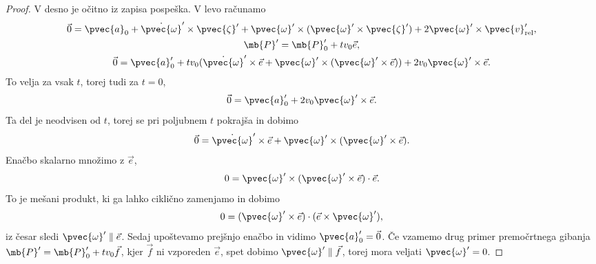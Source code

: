 \begin{proof}
  V desno je očitno iz zapisa pospeška.
  V levo računamo
  \begin{gather*}
	\vec{0} = \pvec{a}_0 + \dot{\pvec{\omega}}' \times \pvec{\zeta}' +
	\pvec{\omega}' \times (\pvec{\omega}' \times \pvec{\zeta}') + 2
	\pvec{\omega}' \times \pvec{v}_{\text{rel}}', \\
	\mb{P}' = \mb{P}_0' + t v_0 \vec{e}, \\
	\vec{0} = \pvec{a}_0' + t v_0 (\dot{\pvec{\omega}}' \times \vec{e} +
	\pvec{\omega}' \times (\pvec{\omega}' \times \vec{e})) + 2 v_0
	\pvec{\omega}' \times \vec{e}.
  \end{gather*}
  To velja za vsak $t$, torej tudi za $t = 0$,
  \[
	\vec{0} = \pvec{a}_0' + 2 v_0 \pvec{\omega}' \times \vec{e}.
  \]
  Ta del je neodvisen od $t$, torej se pri poljubnem $t$ pokrajša in dobimo
  \[
	\vec{0} = \dot{\pvec{\omega}}' \times \vec{e} + \pvec{\omega}' \times
	(\pvec{\omega}' \times \vec{e}).
  \]
  Enačbo skalarno množimo z $\vec{e}$,
  \[
	0 = \pvec{\omega}' \times (\pvec{\omega}' \times \vec{e}) \cdot \vec{e}.
  \]
  To je mešani produkt, ki ga lahko ciklično zamenjamo in dobimo
  \[
	0 = (\pvec{\omega}' \times \vec{e}) \cdot (\vec{e} \times \pvec{\omega}'),
  \]
  iz česar sledi $\pvec{\omega}' \parallel \vec{e}$.
  Sedaj upoštevamo prejšnjo enačbo in vidimo $\pvec{a}_0' = \vec{0}$.
  Če vzamemo drug primer premočrtnega gibanja $\mb{P}' = \mb{P}_0' + t v_0
  \vec{f}$, kjer $\vec{f}$ ni vzporeden $\vec{e}$, spet dobimo $\pvec{\omega}'
  \parallel \vec{f}$, torej mora veljati $\pvec{\omega}' = 0$.
\end{proof}


